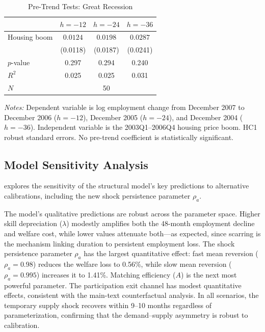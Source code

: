 \documentclass[12pt]{article}
\begin{document}
\begin{table}[H]
\centering
\caption{Pre-Trend Tests: Great Recession}
\label{tab:app_pretrends}
\begin{threeparttable}
\small
\begin{tabular}{lccc}
\toprule
& $h=-12$ & $h=-24$ & $h=-36$ \\
\midrule
Housing boom & $0.0124$ & $0.0198$ & $0.0287$ \\
             & (0.0118) & (0.0187) & (0.0241) \\
$p$-value    & 0.297 & 0.294 & 0.240 \\
$R^2$        & 0.025 & 0.025 & 0.031 \\
\midrule
$N$ & \multicolumn{3}{c}{50} \\
\bottomrule
\end{tabular}
\begin{tablenotes}[flushleft]
\small
\item \textit{Notes:} Dependent variable is log employment change from December 2007 to December 2006 ($h = -12$), December 2005 ($h = -24$), and December 2004 ($h = -36$). Independent variable is the 2003Q1--2006Q4 housing price boom. HC1 robust standard errors. No pre-trend coefficient is statistically significant.
\end{tablenotes}
\end{threeparttable}
\end{table}

\subsection{Model Sensitivity Analysis}

 explores the sensitivity of the structural model's key predictions to alternative calibrations, including the new shock persistence parameter $\rho_a$.



The model's qualitative predictions are robust across the parameter space. Higher skill depreciation ($\lambda$) modestly amplifies both the 48-month employment decline and welfare cost, while lower values attenuate both---as expected, since scarring is the mechanism linking duration to persistent employment loss. The shock persistence parameter $\rho_a$ has the largest quantitative effect: fast mean reversion ($\rho_a = 0.98$) reduces the welfare loss to 0.56\%, while slow mean reversion ($\rho_a = 0.995$) increases it to 1.41\%. Matching efficiency ($A$) is the next most powerful parameter. The participation exit channel has modest quantitative effects, consistent with the main-text counterfactual analysis. In all scenarios, the temporary supply shock recovers within 9--10 months regardless of parameterization, confirming that the demand--supply asymmetry is robust to calibration.
\end{document}
